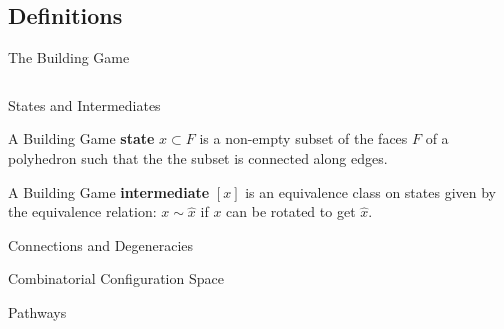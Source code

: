 \documentclass{beamer}
\begin{document}
\subsection{Definitions}
\begin{frame}{The Building Game}
\begin{columns}
    \begin{column}{0.48\textwidth}

    \end{column}
    \begin{column}{0.48\textwidth}
    \end{column}
\end{columns}
\end{frame}
\begin{frame}{States and Intermediates}
\begin{definition}
  A Building Game \textbf{state} $x \subset F$ is a non-empty subset of the faces $F$ of a polyhedron such that the the subset is connected along edges. 
\end{definition} 
\begin{definition}
A Building Game \textbf{intermediate} $[x]$ is an equivalence class on states given by the equivalence relation: $x \sim \hat{x}$ if $x$ can be rotated to get $\hat{x}$.
\end{definition}

\end{frame}
\begin{frame}{Connections and Degeneracies}
\end{frame}
\begin{frame}{Combinatorial Configuration Space}
\end{frame}
\begin{frame}{Pathways}
\end{frame}
\end{document}
